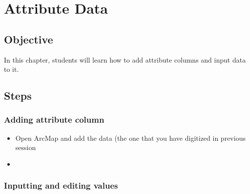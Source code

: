 \chapter{Attribute Data}
\section{Objective}
In this chapter, students will learn how to add attribute columns and input data to it.
\section{Steps}
\subsection{Adding attribute column}
\begin{itemize}
	\item Open ArcMap and add the data (the one that you have digitized in previous session
	\item 
\end{itemize}


\subsection{Inputting and editing values}